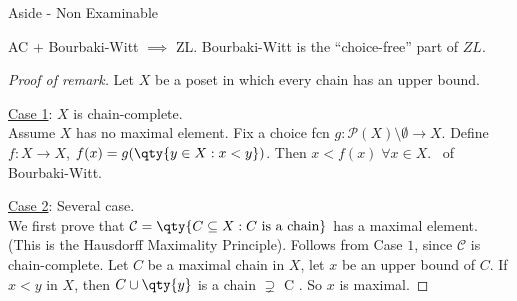 \begin{aside}{Aside - Non Examinable}
    \begin{remark}
        AC + Bourbaki-Witt $\implies$ ZL. Bourbaki-Witt is the ``choice-free'' part of $ZL$.
    \end{remark}

    \begin{proof}[Proof of remark]
        Let $X$ be a poset in which every chain has an upper bound.

        \underline{Case 1}: $X$ is chain-complete. \\
        Assume $X$ has no maximal element.
        Fix a choice fcn $g : \mathcal{P}(X) \setminus \emptyset \to X$.
        Define $f : X \to X$, $f(x) = g(\qty{y \in X : x < y})$.
        Then $x < f(x) \; \forall x \in X$. \Lightning \ of Bourbaki-Witt.

        \underline{Case 2}: Several case. \\
        We first prove that $\mathcal{C} = \qty{C \subseteq X : C \text{ is a chain}}$ has a maximal element.
        (This is the Hausdorff Maximality Principle).
        Follows from Case $1$, since $\mathcal{C}$ is chain-complete.
        Let $C$ be a maximal chain in $X$, let $x$ be an upper bound of $C$.
        If $x < y$ in $X$, then $C \cup \qty{y}$ is a chain $\supsetneq$ C \Lightning.
        So $x$ is maximal.
    \end{proof}
\end{aside}